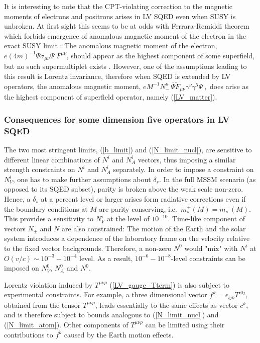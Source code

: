 \documentclass[12pt]{revtex4}
\begin{document}
It is interesting to note that the CPT-violating correction to
the magnetic moments of electrons and positrons arises in LV SQED 
even when SUSY is unbroken. At first sight this seems to 
be at odds with Ferrara-Remiddi theorem which
forbids emergence of anomalous magnetic moment of the
electron in the exact SUSY limit \cite{Ferrara:1974wb}: 
The anomalous magnetic moment of the electron, 
$e(4m)^{-1} \overline{\Psi} \sigma_{\mu\nu} \Psi \; F^{\mu\nu}$,
should appear as the highest component of some superfield, but
no such supermultiplet exists \cite{Ferrara:1974wb}. However, one of
the assumptions leading to this result is Lorentz invariance, therefore 
when SQED is extended by LV operators, the anomalous magnetic 
moment, 
\( 
eM^{-1}N_-^\mu \, \overline{\Psi} \widetilde{F}_{\mu\nu}
\gamma^\nu \gamma^5 \Psi~, 
\) 
does arise as the highest component of superfield  operator, namely 
(\ref{LV_matter}). 


\subsubsection*{Consequences for some dimension five operators in LV
SQED} 


The two most stringent limits, (\ref{b_limit}) and (\ref{N_limit_nucl}),
are sensitive to different linear combinations of $N^i$ and $N_A^i$ vectors,
thus imposing a similar strength constraints on $N^i$ and $N_A^i$
separately. In order to impose a constraint on $N_V^i$, one has to  
make further assumptions about $\delta_s$. In the full MSSM scenario
(as opposed to its SQED subset), parity is broken above the weak
scale non-zero. Hence,  a $\delta_s $ at a percent level or larger
arises form radiative corrections even if the boundary conditions at
$M$ are parity conserving, i.e.\ $m_s^+(M) = m_s^-(M)$. 
This provides a sensitivity to $N_V^i$ at the level of $10^{-10}$. 
Time-like component of vectors $N_\pm$ and $N$ are also constrained:  
The motion of the Earth and the solar system introduces a dependence
of the laboratory frame  on the velocity relative to the fixed vector
backgrounds. Therefore, a non-zero $N^0$ would "mix" with 
$N^i$ at $O(v/c) \sim 10^{-3}-10^{-4}$ level. As a result, 
$10^{-6}-10^{-8}$-level constraints can be 
imposed on $N_V^0$, $N_A^0$ and $N^0$. 


Lorentz violation induced by $ T^{\mu\nu\rho} $ (\ref{LV_gauge_Tterm})
is also subject to experimental constraints. For example, 
a three dimensional vector $ f^k=\epsilon_{ijk} T^{i0j}$, 
obtained from the tensor $T^{\mu\nu\rho} $, leads essentially to the
same effects as  vector $c^k$, and is therefore subject to bounds
analogous to (\ref{N_limit_nucl}) and (\ref{N_limit_atom}). Other
components of $ T^{\mu\nu\rho} $ can be limited using   
their contributions to $f^k$ caused by the Earth motion effects. 
\end{document}
